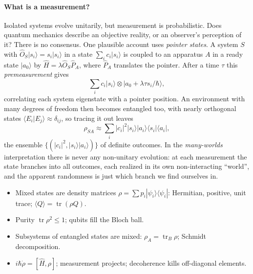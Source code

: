 \paragraph{What is a measurement?} Isolated systems evolve unitarily, but measurement is probabilistic. Does quantum mechanics describe an objective reality, or an observer's perception of it? There is no consensus. One plausible account uses \emph{pointer states}. A system $S$ with $\hat{O}_S|s_i\rangle = s_i|s_i\rangle$ in a state $\sum_ic_i|s_i\rangle$ is coupled to an apparatus $A$ in a ready state $|a_0\rangle$ by $\hat{H} = \lambda\hat{O}_S\hat{P}_A$, where $\hat{P}_A$ translates the pointer. After a time $\tau$ this \emph{premeasurement} gives
\[
    \sum_ic_i|s_i\rangle\otimes|a_0 + \lambda\tau s_i/\hbar\rangle,
\]
correlating each system eigenstate with a pointer position. An environment with many degrees of freedom then becomes entangled too, with nearly orthogonal states $\langle E_i|E_j\rangle\approx\delta_{ij}$, so tracing it out leaves
\[
    \rho_{SA}\approx\sum_i|c_i|^2|s_i\rangle|a_i\rangle\langle s_i|\langle a_i|,
\]
the ensemble $\{(|c_i|^2,|s_i\rangle|a_i\rangle)\}$ of definite outcomes. In the \emph{many-worlds} interpretation there is never any non-unitary evolution: at each measurement the state branches into all outcomes, each realized in its own non-interacting ``world'', and the apparent randomness is just which branch we find ourselves in.

\begin{fact}
\leavevmode
\begin{itemize}
\item Mixed states are density matrices $\rho = \sum p_i|\psi_i\rangle\langle\psi_i|$: Hermitian, positive, unit trace; $\langle Q\rangle = \operatorname{tr}(\rho Q)$.
\item Purity $\operatorname{tr}\rho^2\le1$; qubits fill the Bloch ball.
\item Subsystems of entangled states are mixed: $\rho_A = \operatorname{tr}_B\rho$; Schmidt decomposition.
\item $i\hbar\dot\rho = [\hat{H},\rho]$; measurement projects; decoherence kills off-diagonal elements.
\end{itemize}
\end{fact}
